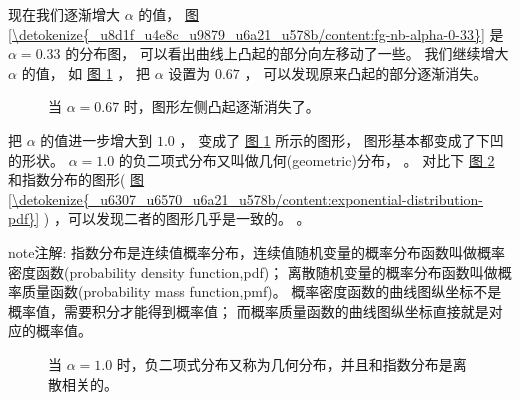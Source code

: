 \documentclass[letterpaper,10pt,english]{sphinxmanual}
\begin{document}
现在我们逐渐增大 \(\alpha\) 的值，
\hyperref[\detokenize{_u8d1f_u4e8c_u9879_u6a21_u578b/content:fg-nb-alpha-0-33}]{图 \ref{\detokenize{_u8d1f_u4e8c_u9879_u6a21_u578b/content:fg-nb-alpha-0-33}}} 是 \(\alpha=0.33\) 的分布图，
可以看出曲线上凸起的部分向左移动了一些。
我们继续增大 \(\alpha\) 的值，
如 \hyperref[\detokenize{_u8d1f_u4e8c_u9879_u6a21_u578b/content:fg-nb-alpha-0-67}]{图 \ref{\detokenize{_u8d1f_u4e8c_u9879_u6a21_u578b/content:fg-nb-alpha-0-67}}} ，
把 \(\alpha\) 设置为 \(0.67\) ，
可以发现原来凸起的部分逐渐消失。

\begin{figure}[htbp]
\centering
\capstart

\noindent{}
\caption{当 \(\alpha=0.67\) 时，图形左侧凸起逐渐消失了。}\label{\detokenize{_u8d1f_u4e8c_u9879_u6a21_u578b/content:id15}}\label{\detokenize{_u8d1f_u4e8c_u9879_u6a21_u578b/content:fg-nb-alpha-0-67}}\end{figure}

把 \(\alpha\) 的值进一步增大到 \(1.0\) ，
变成了 \hyperref[\detokenize{_u8d1f_u4e8c_u9879_u6a21_u578b/content:fg-nb-alpha-0-67}]{图 \ref{\detokenize{_u8d1f_u4e8c_u9879_u6a21_u578b/content:fg-nb-alpha-0-67}}} 所示的图形，
图形基本都变成了下凹的形状。
\(\alpha=1.0\) 的负二项式分布又叫做几何(geometric)分布，
。
对比下 \hyperref[\detokenize{_u8d1f_u4e8c_u9879_u6a21_u578b/content:fg-nb-alpha-1-0}]{图 \ref{\detokenize{_u8d1f_u4e8c_u9879_u6a21_u578b/content:fg-nb-alpha-1-0}}} 和指数分布的图形( \hyperref[\detokenize{_u6307_u6570_u6a21_u578b/content:exponential-distribution-pdf}]{图 \ref{\detokenize{_u6307_u6570_u6a21_u578b/content:exponential-distribution-pdf}}} )
，可以发现二者的图形几乎是一致的。
。

\begin{sphinxadmonition}{note}{注解:}
指数分布是连续值概率分布，连续值随机变量的概率分布函数叫做概率密度函数(probability density function,pdf)；
离散随机变量的概率分布函数叫做概率质量函数(probability mass function,pmf)。
概率密度函数的曲线图纵坐标不是概率值，需要积分才能得到概率值；
而概率质量函数的曲线图纵坐标直接就是对应的概率值。
\end{sphinxadmonition}

\begin{figure}[htbp]
\centering
\capstart

\noindent{}
\caption{当 \(\alpha=1.0\) 时，负二项式分布又称为几何分布，并且和指数分布是离散相关的。}\label{\detokenize{_u8d1f_u4e8c_u9879_u6a21_u578b/content:id16}}\label{\detokenize{_u8d1f_u4e8c_u9879_u6a21_u578b/content:fg-nb-alpha-1-0}}\end{figure}
\end{document}
